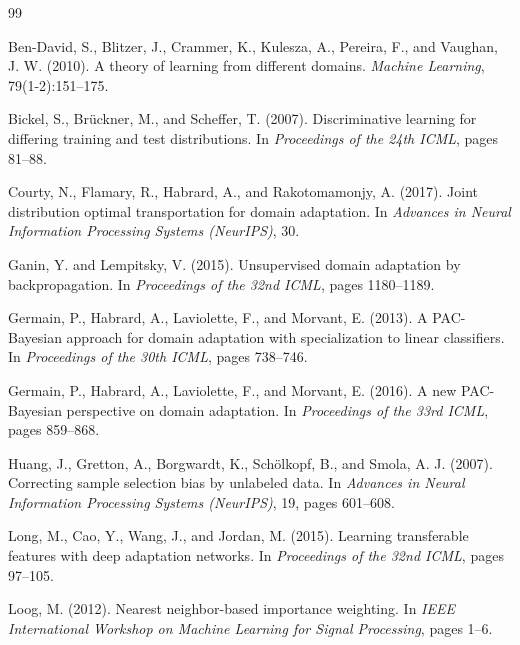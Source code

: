 \documentclass[11pt]{article}
\begin{document}

\begin{thebibliography}{99}

Ben-David, S., Blitzer, J., Crammer, K., Kulesza, A., Pereira, F., and Vaughan, J. W. (2010).
A theory of learning from different domains.
\textit{Machine Learning}, 79(1-2):151--175.

Bickel, S., Brückner, M., and Scheffer, T. (2007).
Discriminative learning for differing training and test distributions.
In \textit{Proceedings of the 24th ICML}, pages 81--88.

Courty, N., Flamary, R., Habrard, A., and Rakotomamonjy, A. (2017).
Joint distribution optimal transportation for domain adaptation.
In \textit{Advances in Neural Information Processing Systems (NeurIPS)}, 30.

Ganin, Y. and Lempitsky, V. (2015).
Unsupervised domain adaptation by backpropagation.
In \textit{Proceedings of the 32nd ICML}, pages 1180--1189.

Germain, P., Habrard, A., Laviolette, F., and Morvant, E. (2013).
A PAC-Bayesian approach for domain adaptation with specialization to linear classifiers.
In \textit{Proceedings of the 30th ICML}, pages 738--746.

Germain, P., Habrard, A., Laviolette, F., and Morvant, E. (2016).
A new PAC-Bayesian perspective on domain adaptation.
In \textit{Proceedings of the 33rd ICML}, pages 859--868.

Huang, J., Gretton, A., Borgwardt, K., Schölkopf, B., and Smola, A. J. (2007).
Correcting sample selection bias by unlabeled data.
In \textit{Advances in Neural Information Processing Systems (NeurIPS)}, 19, pages 601--608.

Long, M., Cao, Y., Wang, J., and Jordan, M. (2015).
Learning transferable features with deep adaptation networks.
In \textit{Proceedings of the 32nd ICML}, pages 97--105.

Loog, M. (2012).
Nearest neighbor-based importance weighting.
In \textit{IEEE International Workshop on Machine Learning for Signal Processing}, pages 1--6.


\end{thebibliography}
\end{document}
